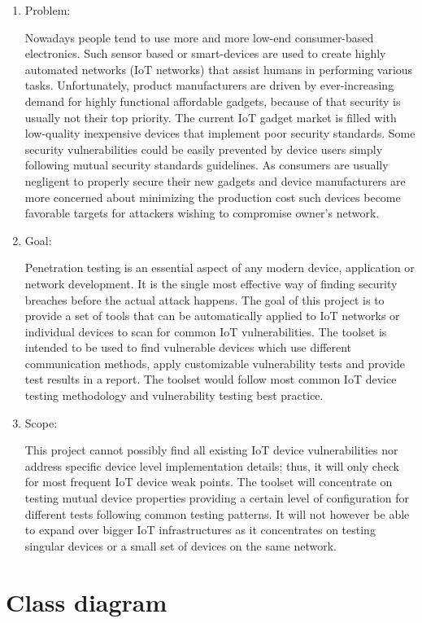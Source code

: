 \documentclass{article}
\begin{document}
\begin{enumerate}
	\item Problem:
	
	Nowadays people tend to use more and more low-end consumer-based electronics. Such sensor based or smart-devices are used to create highly automated networks (IoT networks) that assist humans in performing various tasks. Unfortunately, product manufacturers are driven by ever-increasing demand for highly functional affordable gadgets, because of that security is usually not their top priority. The current IoT gadget market is filled with low-quality inexpensive devices that implement poor security standards. Some security vulnerabilities could be easily prevented by device users simply following mutual security standards guidelines. As consumers are usually negligent to properly secure their new gadgets and device manufacturers are more concerned about minimizing the production cost such devices become favorable targets for attackers wishing to compromise owner’s network.
	\item Goal:
	
	Penetration testing is an essential aspect of any modern device, application or network development. It is the single most effective way of finding security breaches before the actual attack happens. The goal of this project is to provide a set of tools that can be automatically applied to IoT networks or individual devices to scan for common IoT vulnerabilities. The toolset is intended to be used to find vulnerable devices which use different communication methods, apply customizable vulnerability tests and provide test results in a report. The toolset would follow most common IoT device testing methodology and vulnerability testing best practice.
	\item Scope:
	
	This project cannot possibly find all existing IoT device vulnerabilities nor address specific device level implementation details; thus, it will only check for most frequent IoT device weak points. The toolset will concentrate on testing mutual device properties providing a certain level of configuration for different tests following common testing patterns. It will not however be able to expand over bigger IoT infrastructures as it concentrates on testing singular devices or a small set of devices on the same network.
\end{enumerate}

\section{Class diagram}\label{sec:appendix-class-diag}
\end{document}
